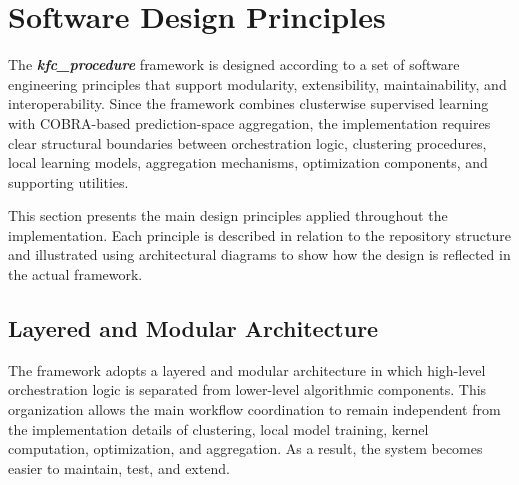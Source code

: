 \section{Software Design Principles}
\label{sec:software_design_principles}

\hs The \textbf{\textit{kfc\_procedure}} framework is designed according to a set of software engineering principles that support modularity, extensibility, maintainability, and interoperability. Since the framework combines clusterwise supervised learning with COBRA-based prediction-space aggregation, the implementation requires clear structural boundaries between orchestration logic, clustering procedures, local learning models, aggregation mechanisms, optimization components, and supporting utilities.

This section presents the main design principles applied throughout the implementation. Each principle is described in relation to the repository structure and illustrated using architectural diagrams to show how the design is reflected in the actual framework.

\subsection{Layered and Modular Architecture}

\hs The framework adopts a layered and modular architecture in which high-level orchestration logic is separated from lower-level algorithmic components. This organization allows the main workflow coordination to remain independent from the implementation details of clustering, local model training, kernel computation, optimization, and aggregation. As a result, the system becomes easier to maintain, test, and extend.

